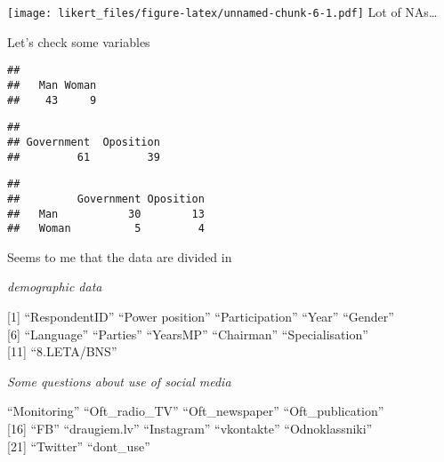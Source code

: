 \documentclass[
]{article}
\newenvironment{Shaded}{\begin{snugshade}}{\end{snugshade}}
\newcommand{\DataTypeTok}[1]{\textcolor[rgb]{0.13,0.29,0.53}{#1}}
\newcommand{\KeywordTok}[1]{\textcolor[rgb]{0.13,0.29,0.53}{\textbf{#1}}}
\newcommand{\NormalTok}[1]{#1}
\newcommand{\OperatorTok}[1]{\textcolor[rgb]{0.81,0.36,0.00}{\textbf{#1}}}
\newcommand{\StringTok}[1]{\textcolor[rgb]{0.31,0.60,0.02}{#1}}
\begin{document}
\texttt{[image: likert\_files/figure-latex/unnamed-chunk-6-1.pdf]} Lot of
NAs\ldots{}

Let's check some variables

\begin{Shaded}
\end{Shaded}

\begin{verbatim}
## 
##   Man Woman 
##    43     9
\end{verbatim}

\begin{Shaded}
\end{Shaded}

\begin{verbatim}
## 
## Government  Oposition 
##         61         39
\end{verbatim}

\begin{Shaded}
\end{Shaded}

\begin{verbatim}
##        
##         Government Oposition
##   Man           30        13
##   Woman          5         4
\end{verbatim}

Seems to me that the data are divided in

\emph{demographic data}

{[}1{]} ``RespondentID'' ``Power position'' ``Participation'' ``Year''
``Gender''\\
{[}6{]} ``Language'' ``Parties'' ``YearsMP'' ``Chairman''
``Specialisation''\\
{[}11{]} ``8.LETA/BNS''

\emph{Some questions about use of social media}

``Monitoring'' ``Oft\_radio\_TV'' ``Oft\_newspaper''
``Oft\_publication''\\
{[}16{]} ``FB'' ``draugiem.lv'' ``Instagram'' ``vkontakte''
``Odnoklassniki''\\
{[}21{]} ``Twitter'' ``dont\_use''
\end{document}

